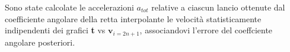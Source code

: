 \documentclass[a4paper,11pt,oneside]{article}
\begin{document}

Sono state calcolate le accelerazioni $a_{tot}$ relative a ciascun lancio ottenute dal coefficiente angolare della retta interpolante le velocità statisticamente indipendenti dei grafici \textbf{t} vs $\textbf{v}_{i=2n+1}$, associandovi l'errore del coeffciente angolare posteriori.
\end{document}
